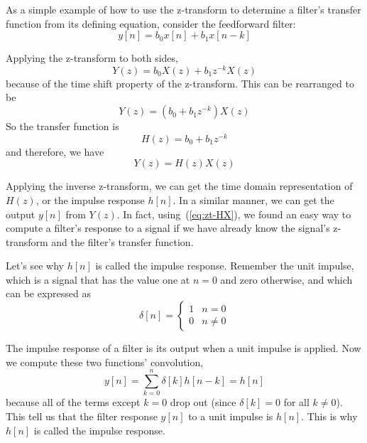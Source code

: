 As a simple example of how to use the z-transform to determine a
filter's transfer function from its defining equation, consider the
feedforward filter:
\begin{equation}
y[n] = b_0x[n] + b_1x[n-k]
\end{equation}

Applying the z-transform to both sides, 
\begin{equation}
Y(z) = b_0X(z) + b_1z^{-k}X(z)
\end{equation}
because of the time shift property of the z-transform. This can be
rearranged to be
\begin{equation}
Y(z) = (b_0 + b_1z^{-k})X(z)
\end{equation}
So the transfer function is 
\begin{equation}
H(z) = b_0 + b_1z^{-k}
\end{equation}
and therefore, we have
\begin{equation}
Y(z)=H(z)X(z)
\end{equation} 

Applying the inverse z-transform, we can get the time domain
representation of $H(z)$, or the impulse response $h[n]$. In a similar
manner, we can get the output $y[n]$ from $Y(z)$.  In fact,
using~(\ref{eq:zt-HX}), we found an easy way to compute a filter's
response to a signal if we have already know the signal's z-transform
and the filter's transfer function.

Let's see why $h[n]$ is called the impulse response.  Remember the unit
impulse, which is a signal that has the value one at $n=0$ and zero
otherwise, and which can be expressed as
\begin{equation}
\delta[n] = \left\{\begin{array}{ll}
                        1 & n=0 \\
                        0 & n \neq 0
          \end{array}\right.
\end{equation}

The impulse response of a filter is its output when a unit impulse is
applied. Now we compute these two functions' convolution,
\begin{equation}
y[n]=\sum_{k=0}^{n}\delta[k] h[n-k] = h[n]
\end{equation}
because all of the terms except $k=0$ drop out (since $\delta[k]=0$
for all $k \ne 0$).  This tell us that the filter response $y[n]$ to a
unit impulse is $h[n]$. This is why $h[n]$ is called the impulse
response.

